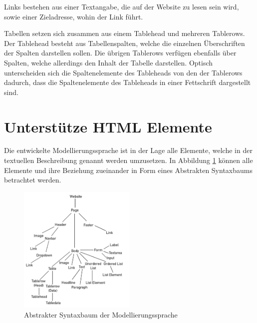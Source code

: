 Links bestehen aus einer Textangabe, die auf der Website zu lesen sein wird, sowie einer Zieladresse, wohin der Link führt.

Tabellen setzen sich zusammen aus einem Tablehead und mehreren Tablerows. Der Tablehead besteht aus Tabellenspalten, welche die einzelnen Überschriften der Spalten darstellen sollen. Die übrigen Tablerows verfügen ebenfalls über Spalten, welche allerdings den Inhalt der Tabelle darstellen. Optisch unterscheiden sich die Spaltenelemente des Tableheads von den der Tablerows dadurch, dass die Spaltenelemente des Tableheads in einer Fettschrift dargestellt sind.

\section{Unterstütze HTML Elemente}
Die entwickelte Modellierungssprache ist in der Lage alle Elemente, welche in der textuellen Beschreibung genannt werden umzusetzen. In Abbildung \ref{ast} können alle Elemente und ihre Beziehung zueinander in Form eines Abstrakten Syntaxbaums betrachtet werden.

\begin{figure}[H]
	\centering
	\includegraphics[width=0.5\textwidth]{img/Ast.png}
	\caption[Abstrakter Syntaxbaum der Modellierungssprache]{Abstrakter Syntaxbaum der Modellierungssprache}
	\label{ast}
\end{figure}


